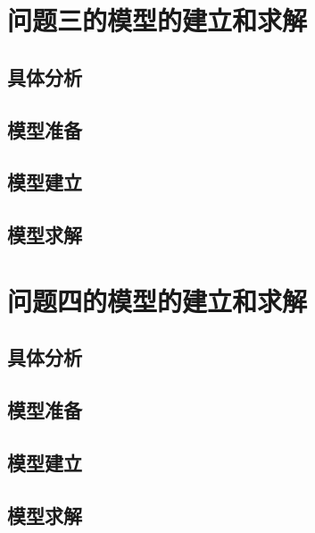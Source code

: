 \documentclass[withoutpreface,bwprint]{cumcmthesis}
\begin{document}
\section{问题三的模型的建立和求解}
\subsection{具体分析}

\subsection{模型准备}

\subsection{模型建立}

\subsection{模型求解}
















\newpage
\section{问题四的模型的建立和求解}
\subsection{具体分析}

\subsection{模型准备}

\subsection{模型建立}

\subsection{模型求解}
\end{document}
